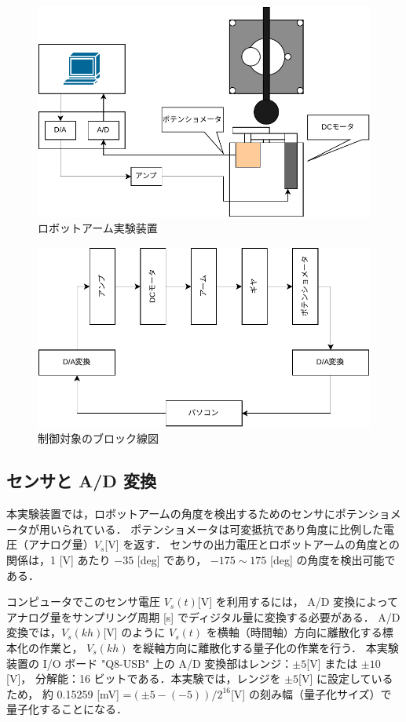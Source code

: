 \begin{figure}[h]
  \centering
  \includegraphics[scale=0.4]{sozai/1.pdf}
  \caption{ロボットアーム実験装置}
\end{figure}

\begin{figure}[h]
  \centering
  \includegraphics[scale=0.65]{sozai/2.pdf}
  \caption{制御対象のブロック線図}
\end{figure}

\subsection{センサと A/D 変換}

本実験装置では，ロボットアームの角度を検出するためのセンサにポテンショメータが用いられている．
ポテンショメータは可変抵抗であり角度に比例した電圧（アナログ量）\(V_s\)[V] を返す．
センサの出力電圧とロボットアームの角度との関係は，1 [V] あたり \(-35\) [deg] であり，
\(-175 \sim 175\) [deg] の角度を検出可能である．

コンピュータでこのセンサ電圧 \(V_s(t) \)[V] を利用するには，
A/D 変換によってアナログ量をサンプリング周期 [s] でディジタル量に変換する必要がある．
A/D 変換では，\(V_s(kh) \)[V] のように \(V_s(t)\) を横軸（時間軸）方向に離散化する標本化の作業と，
\(V_s(kh)\) を縦軸方向に離散化する量子化の作業を行う．
本実験装置の I/O ボード "Q8-USB" 上の A/D 変換部はレンジ：\(\pm 5 \)[V] または \(\pm 10 \)[V]，
分解能：16 ビットである．本実験では，レンジを \(\pm 5 \)[V] に設定しているため，
約 0.15259 [mV] =\( (\pm 5 - (-5))/2^{16} \)[V] の刻み幅（量子化サイズ）で量子化することになる．

